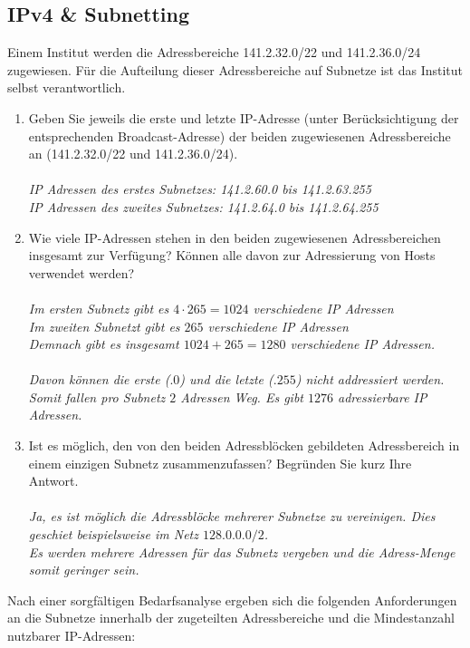 \documentclass[a4paper]{article}
\begin{document}
\subsection{IPv4 \& Subnetting}
Einem Institut werden die Adressbereiche 141.2.32.0/22 und 141.2.36.0/24 zugewiesen. Für die Aufteilung dieser Adressbereiche auf Subnetze ist das Institut selbst verantwortlich.
\begin{enumerate}[label=(\alph*)]
    \item Geben Sie jeweils die erste und letzte IP-Adresse (unter Berücksichtigung der entsprechenden Broadcast-Adresse) der beiden zugewiesenen Adressbereiche an (141.2.32.0/22 und 141.2.36.0/24).\\\\
    \textit{
    IP Adressen des erstes Subnetzes:   141.2.60.0 bis 141.2.63.255\\
    IP Adressen des zweites Subnetzes:  141.2.64.0 bis 141.2.64.255
    }
    \item Wie viele IP-Adressen stehen in den beiden zugewiesenen Adressbereichen insgesamt zur Verfügung? Können alle davon zur Adressierung von Hosts verwendet werden?\\\\
    \textit{
    Im ersten Subnetz gibt es $4 \cdot 265 = 1024$ verschiedene IP Adressen\\
    Im zweiten Subnetzt gibt es $265$ verschiedene IP Adressen\\
    Demnach gibt es insgesamt $1024 + 265 = 1280$ verschiedene IP Adressen.\\\\
    Davon können die erste ($.0$) und die letzte ($.255$) nicht addressiert werden. Somit fallen pro Subnetz $2$ Adressen Weg. Es gibt $1276$ adressierbare IP Adressen.
    }
    \item Ist es möglich, den von den beiden Adressblöcken gebildeten Adressbereich in einem einzigen Subnetz zusammenzufassen? Begründen Sie kurz Ihre Antwort.\\\\
    \textit{
    Ja, es ist möglich die Adressblöcke mehrerer Subnetze zu vereinigen. Dies geschiet beispielsweise im Netz $128.0.0.0/2$.\\
    Es werden mehrere Adressen für das Subnetz vergeben und die Adress-Menge somit geringer sein.
    }
\end{enumerate}
Nach einer sorgfältigen Bedarfsanalyse ergeben sich die folgenden Anforderungen an die Subnetze innerhalb der zugeteilten Adressbereiche und die Mindestanzahl nutzbarer IP-Adressen:\\
\end{document}
